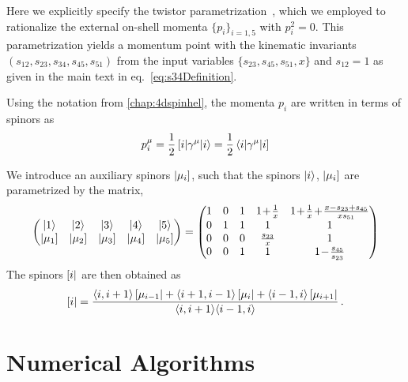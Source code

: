 Here we explicitly specify the twistor parametrization~\cite{Hodges:2009hk}, which
we employed to rationalize the external on-shell momenta $\{p_i\}_{i=1,5}$ with
$p_i^2=0$. This parametrization yields a momentum point with the
kinematic invariants $(s_{12}, s_{23}, s_{34}, s_{45}, s_{51})$ from the
input variables $\{ s_{23}, s_{45}, s_{51}, x \}$ and $s_{12}=1$ 
as given in the main text in eq.~\eqref{eq:s34Definition}.

Using the notation from \cref{chap:4dspinhel}, the momenta $p_i$ are written in terms of spinors as
\begin{equation}
  p^\mu_i = \frac{1}{2}\sbraket(i,\gamma^\mu,i) = \frac{1}{2}\brasket(i,\gamma^\mu,i)
\end{equation}

We introduce an auxiliary spinors $\left\vert \mu_i \right]$,
such that the spinors $\ket{i}$, $\left\vert \mu_i \right]$ are parametrized by the matrix,
\begin{equation}
  \begin{pmatrix}
    \ket{1} &  \ket{2} &   \ket{3} &   \ket{4} &  
    \ket{5} \\   
    \sket{\mu_1} &  
    \sket{\mu_2} &  
    \sket{\mu_3} &  
    \sket{\mu_4} &  
    \sket{\mu_5} 
  \end{pmatrix}
  =
  \begin{pmatrix}
    1 & 0 & 1 & 1 \!+\! \frac{1}{x}  &  1 \!+\! \frac{1}{x} \!+\! \frac{x-s_{23}+s_{45}}{x s_{51}}\\
    0 & 1 & 1 & 1                    &  1\\
    0 & 0 & 0 & \frac{s_{23}}{x}     &  1\\
    0 & 0 & 1 & 1                    & 1 \!-\! \frac{s_{45}}{s_{23}}
  \end{pmatrix}
  \label{eq:TwistorParametrization}
\end{equation}
%
The spinors $\left[ i \right\vert$ are then obtained as
\begin{equation}
\left[ i \right\vert = \frac{\langle i, i+1 \rangle \left[ \mu_{i-1} \right\vert + \langle i+1, i-1\rangle \left[ \mu_{i} \right\vert + \langle i-1, i \rangle\left[ \mu_{i+1} \right\vert}{\langle i, i+1\rangle \langle i-1, i\rangle}\, .
\end{equation}





\chapter{Numerical Algorithms}

